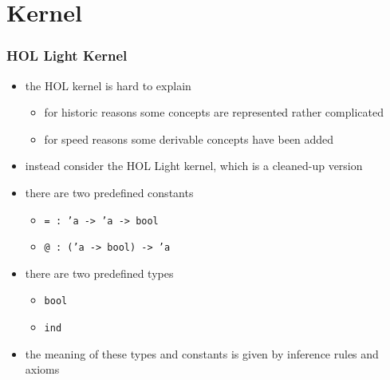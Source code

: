 \section{Kernel}
\begin{frame}
\frametitle{HOL Light Kernel}

\begin{itemize}
\item the HOL kernel is hard to explain
\begin{itemize}
\item for historic reasons some concepts are represented rather complicated
\item for speed reasons some derivable concepts have been added
\end{itemize}
\item instead consider the HOL Light kernel, which is a cleaned-up version
\item there are two predefined constants
\begin{itemize}
\item \texttt{= :\ 'a -> 'a -> bool}
\item \texttt{@ :\ ('a -> bool) -> 'a}
\end{itemize}
\item there are two predefined types
\begin{itemize}
\item \texttt{bool}
\item \texttt{ind}
\end{itemize}
\item the meaning of these types and constants is given by inference rules and axioms
\end{itemize}
\end{frame}

